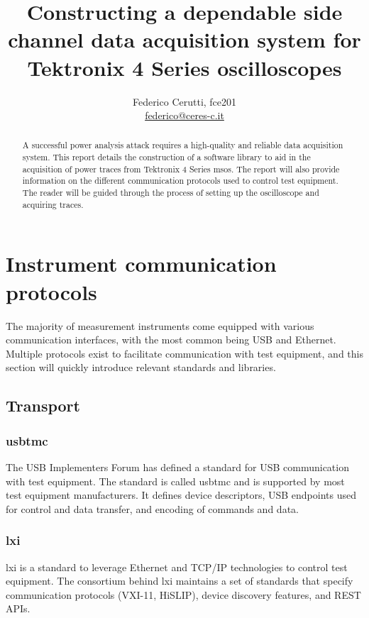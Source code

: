 \documentclass[a4paper,english,twoside,10pt]{article}
\title{Constructing a dependable side channel data acquisition system for Tektronix 4 Series oscilloscopes}
\author{Federico Cerutti, fce201 \\\href{mailto:federico@ceres-c.it}{federico@ceres-c.it}}
\begin{document}
\maketitle%

\begin{abstract}
	A successful power analysis attack requires a high-quality and reliable data acquisition system. This report details the construction of a software library to aid in the acquisition of power traces from Tektronix 4 Series \glspl{mso}. The report will also provide information on the different communication protocols used to control test equipment. The reader will be guided through the process of setting up the oscilloscope and acquiring traces.
\end{abstract}

\section{Instrument communication protocols}\label{sec:comm-protocols}
The majority of measurement instruments come equipped with various communication interfaces, with the most common being USB and Ethernet. Multiple protocols exist to facilitate communication with test equipment, and this section will quickly introduce relevant standards and libraries.

\subsection{Transport}
\subsubsection{\texorpdfstring{\gls{usbtmc}}{USB-TMC}}\label{sec:usbtmc}
The USB Implementers Forum has defined a standard for USB communication with test equipment. The standard is called \gls{usbtmc} and is supported by most test equipment manufacturers. It defines device descriptors, USB endpoints used for control and data transfer, and encoding of commands and data.

\subsubsection{\texorpdfstring{\gls{lxi}}{LXI}}\label{sec:lxi}
\gls{lxi} is a standard to leverage Ethernet and TCP/IP technologies to control test equipment. The consortium behind \gls{lxi} maintains a set of standards that specify communication protocols (VXI-11, HiSLIP), device discovery features, and REST APIs.
\end{document}
